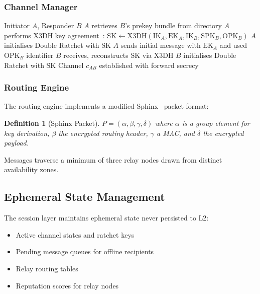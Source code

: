 \documentclass[11pt,a4paper]{article}
\newtheorem{definition}{Definition}[section]
\begin{document}
\subsubsection{Channel Manager}

\begin{algorithm}[H]
\caption{Channel Establishment Protocol}
\label{alg:channel-establish}
\begin{algorithmic}[1]
\Require Initiator $A$, Responder $B$
\State $A$ retrieves $B$'s prekey bundle from directory
\State $A$ performs X3DH key agreement~\cite{marlinspike2016x3dh}:
    \Statex \quad $\mathrm{SK} \gets
        \mathrm{X3DH}(\mathrm{IK}_A, \mathrm{EK}_A,
        \mathrm{IK}_B, \mathrm{SPK}_B, \mathrm{OPK}_B)$
\State $A$ initialises Double Ratchet with SK
\State $A$ sends initial message with $\mathrm{EK}_A$ and used
       $\mathrm{OPK}_B$ identifier
\State $B$ receives, reconstructs SK via X3DH
\State $B$ initialises Double Ratchet with SK
\State Channel $c_{AB}$ established with forward secrecy
\end{algorithmic}
\end{algorithm}

\subsubsection{Routing Engine}

The routing engine implements a modified Sphinx~\cite{danezis2009sphinx}
packet format:

\begin{definition}[Sphinx Packet]
    $P = (\alpha, \beta, \gamma, \delta)$ where $\alpha$ is a group
    element for key derivation, $\beta$ the encrypted routing header,
    $\gamma$ a MAC, and $\delta$ the encrypted payload.
\end{definition}

Messages traverse a minimum of three relay nodes drawn from distinct
availability zones.

\subsection{Ephemeral State Management}

The session layer maintains ephemeral state never persisted to L2:

\begin{itemize}
    \item Active channel states and ratchet keys
    \item Pending message queues for offline recipients
    \item Relay routing tables
    \item Reputation scores for relay nodes
\end{itemize}
\end{document}
